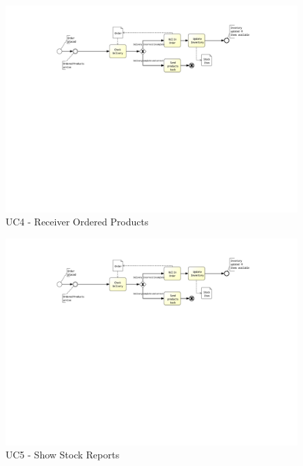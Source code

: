 \begin{figure}[h!]
	\centering
	\includegraphics[width=\textwidth, trim={5cm 14cm 6cm 2cm}]{img/UC4.pdf}
	\caption{UC4 - Receiver Ordered Products }
	\label{fig:UC4}
\end{figure}

\begin{figure}[h!]
	\centering
	\includegraphics[width=\textwidth, trim={5cm 14cm 6cm 2cm}]{img/UC4.pdf}
	\caption{UC5 - Show Stock Reports }
	\label{fig:UC5}
\end{figure}

